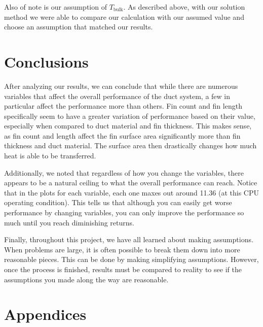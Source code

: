 \documentclass[12pt, titlepage]{article}
\begin{document}
Also of note is our assumption of $T_{\text{bulk}}$. As described above, with our solution method we were able to compare our calculation with our assumed value and choose an assumption that matched our results.

\section{Conclusions}

After analyzing our results, we can conclude that while there are numerous variables that affect the overall performance of the duct system, a few in particular affect the performance more than others. Fin count and fin length specifically seem to have a greater variation of performance based on their value, especially when compared to duct material and fin thickness. This makes sense, as fin count and length affect the fin surface area significantly more than fin thickness and duct material. The surface area then drastically changes how much heat is able to be transferred.

Additionally, we noted that regardless of how you change the variables, there appears to be a natural ceiling to what the overall performance can reach. Notice that in the plots for each variable, each one maxes out around 11.36 (at this CPU operating condition). This tells us that although you can easily get worse performance by changing variables, you can only improve the performance so much until you reach diminishing returns. 

Finally, throughout this project, we have all learned about making assumptions. When problems are large, it is often possible to break them down into more reasonable pieces. This can be done by making simplifying assumptions. However, once the process is finished, results must be compared to reality to see if the assumptions you made along the way are reasonable.

\newpage
\section{Appendices}
\end{document}
